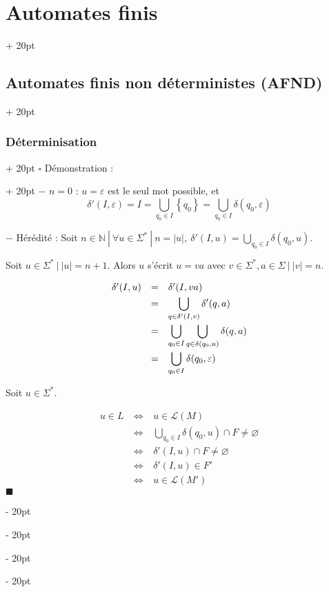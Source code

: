 \documentclass[a4paper, 12pt, twoside]{article}
\newcommand{\N}{\mathbb{N}} %
\newcommand{\set}[1]{\left\{ #1 \right\}}
\newcommand{\abs}[1]{\left\lvert #1 \right\rvert}
\newcommand{\ssi}{\ \Leftrightarrow \ }
\newcommand{\ind}[1][20pt]{\advance\leftskip + #1}
\newcommand{\deind}[1][20pt]{\advance\leftskip - #1}
\newenvironment{indt}[2][20pt]{#2 \par \ind[#1]}{\par \deind} %
\newenvironment{proof}[1][{Démonstration :}]{\begin{indt}{$\square$ #1}}{$\blacksquare$ \end{indt}}
\begin{document}
\begin{indt}{\section{Automates finis}}
\begin{indt}{\subsection{Automates finis non déterministes (AFND)}}
\begin{indt}{\subsubsection{Déterminisation}}
\begin{proof}
                    $-$ $n = 0$ : $u = \varepsilon$ est le seul mot possible, et
                    \[
                        \delta'(I, \varepsilon) = I = \bigcup_{q_0 \in I} \set{q_0} = \bigcup_{q_0 \in I} \delta(q_0, \varepsilon)
                    \]

                    $-$ Hérédité : Soit $n \in \N\ |\ \forall u \in \Sigma^*\ |\ n = \abs u,\ \delta'(I, u) = \displaystyle \bigcup_{q_0 \in I} \delta (q_0, u)$.

                    Soit $u \in \Sigma^*\ |\ \abs u = n + 1$. Alors $u$ s'écrit $u = va$ avec $v \in \Sigma^*, a \in \Sigma\ |\ \abs v = n$.

                    \[
                        \begin{array}{rcl}
                            \delta'(I, u)
                            &=& \delta'(I, va)
                            \vspace{3pt}
                            \\
                            &=& \displaystyle \bigcup_{q \in \delta'(I, v)} \delta'(q, a)
                            \vspace{3pt}
                            \\
                            &=& \displaystyle \bigcup_{q_0 \in I} \bigcup_{q \in \delta(q_0, u)} \delta(q, a)
                            \vspace{3pt}
                            \\
                            &=& \displaystyle \bigcup_{q_0 \in I} \delta(q_0, \varepsilon)
                        \end{array}
                    \]

                    Soit $u \in \Sigma^*$.

                    \[
                        \begin{array}{rcl}
                            u \in L
                            &\ssi& u \in \mathcal L(M)
                            \\
                            &\ssi& \displaystyle \bigcup_{q_0 \in I} \delta(q_0, u) \cap F \neq \varnothing
                            \\
                            &\ssi& \delta'(I, u) \cap F \neq \varnothing
                            \\
                            &\ssi& \delta'(I, u) \in F'
                            \\
                            &\ssi& u \in \mathcal L(M')
                        \end{array}
                    \]
                \end{proof}


\end{indt}
\end{indt}
\end{indt}
\end{document}
